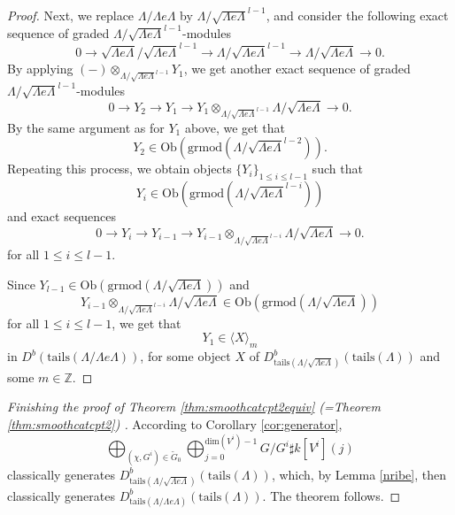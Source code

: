 \documentclass[11pt,reqno]{amsart}
\theoremstyle{definition}
\begin{document}
\begin{proof}
Next, we replace $\Lambda / \Lambda e \Lambda$
by $\Lambda / \sqrt{ \Lambda e \Lambda}^{l-1}$, and consider the following
exact sequence of
graded $\Lambda / \sqrt{ \Lambda e \Lambda}^{l-1}$-modules
$$
0 \longrightarrow \sqrt{ \Lambda e \Lambda} / \sqrt{ \Lambda e \Lambda}^{l-1}
\longrightarrow \Lambda  / \sqrt{ \Lambda e \Lambda}^{l-1} 
\longrightarrow \Lambda / \sqrt{ \Lambda e \Lambda} \longrightarrow 0. 
$$
By applying
$(-)\otimes_{\Lambda  
/ \sqrt{ \Lambda e \Lambda}^{l-1}}Y_1$,
we get another exact sequence
of graded $\Lambda
/ \sqrt{ \Lambda e \Lambda}^{l-1}$-modules 
$$
0 \longrightarrow Y_2 \longrightarrow Y_1 \longrightarrow Y_1 \otimes_{\Lambda
/ \sqrt{ \Lambda e \Lambda}^{l-1}} \Lambda/ \sqrt{ \Lambda e \Lambda}  \longrightarrow 0.
$$
By the same argument as for $Y_1$ above, 
we get that 
$$
Y_2 \in 
\mathrm{Ob}(\mathrm{grmod}( \Lambda
/ \sqrt{ \Lambda e \Lambda}^{l-2} )). 
$$
Repeating this process,
we obtain objects $\{Y_i\}_{1 \leq i \leq l-1}$ such that 
$$
Y_i \in \mathrm{Ob}(
\mathrm{grmod}( \Lambda / \sqrt{ \Lambda e \Lambda}^{l-i}))  
$$
and exact sequences
$$
0 \longrightarrow Y_{i} \longrightarrow Y_{i-1} \longrightarrow Y_{i-1} 
\otimes_{\Lambda / \sqrt{ \Lambda e \Lambda}^{l-i}} \Lambda/ \sqrt{ \Lambda e \Lambda}  \longrightarrow 0.
$$
for all $1 \leq i \leq l-1$. 

Since $Y_{l-1} \in 
\mathrm{Ob}( \mathrm{grmod}( \Lambda / \sqrt{ \Lambda e \Lambda} ))$ and 
$$Y_{i-1} \otimes_{\Lambda / \sqrt{ \Lambda e \Lambda}^{l-i}} \Lambda/ \sqrt{ \Lambda e \Lambda} \in 
\mathrm{Ob}(\mathrm{grmod}( \Lambda / \sqrt{ \Lambda e \Lambda} ))$$ for all $1 \leq i \leq l-1$, 
we get that 
$$
Y_1
\in \langle X  \rangle_{m}
$$	
in $D^{b}(\mathrm{tails}(\Lambda / \Lambda e \Lambda))$, for some object $X$ of 
$D^{b}_{\mathrm{tails}(\Lambda/ \sqrt{ \Lambda e \Lambda})}(\mathrm{tails}(\Lambda))$ 
and some $m \in \mathbb{Z}$.   		
\end{proof}


\begin{proof}
[Finishing the proof of 
Theorem \ref{thm:smoothcatcpt2equiv} (=Theorem \ref{thm:smoothcatcpt2}) 
]
According to Corollary \ref{cor:generator},
$$\bigoplus_{(\chi, G^i) \in \tilde{G}_0} 
\bigoplus_{j = 0}^{\mathrm{dim}(V^i) -1} G / G^i \sharp k[V^i](j)$$
classically generates $D^{b}_{\mathrm{tails}
(\Lambda / \sqrt{\Lambda e \Lambda})}( \mathrm{tails}(\Lambda))$,
which, by Lemma \ref{nribe},
then classically 
generates
$D^{b}_{\mathrm{tails}
(\Lambda /\Lambda e \Lambda)}( \mathrm{tails}
(\Lambda))$.
The theorem follows. 
\end{proof}
\end{document}
